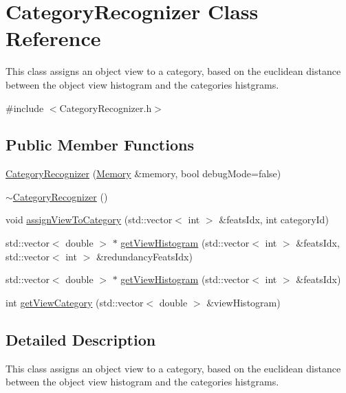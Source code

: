 \hypertarget{class_category_recognizer}{}\section{Category\+Recognizer Class Reference}
\label{class_category_recognizer}


This class assigns an object view to a category, based on the euclidean distance between the object view histogram and the categories histgrams.  




{\ttfamily \#include $<$Category\+Recognizer.\+h$>$}

\subsection*{Public Member Functions}
\begin{DoxyCompactItemize}
\item 
\hyperlink{class_category_recognizer_a67c56c30b0cb2783842c53169e7176c4}{Category\+Recognizer} (\hyperlink{class_memory}{Memory} \&memory, bool debug\+Mode=false)
\item 
\hyperlink{class_category_recognizer_a0b47f145ff89da44fa5191a52a6c558a}{$\sim$\+Category\+Recognizer} ()
\item 
void \hyperlink{class_category_recognizer_abb06a33eac9f693dc38a40f8c0b107f8}{assign\+View\+To\+Category} (std\+::vector$<$ int $>$ \&feats\+Idx, int category\+Id)
\item 
std\+::vector$<$ double $>$ $\ast$ \hyperlink{class_category_recognizer_ac712455609c64f0caca9977519824d7d}{get\+View\+Histogram} (std\+::vector$<$ int $>$ \&feats\+Idx, std\+::vector$<$ int $>$ \&redundancy\+Feats\+Idx)
\item 
std\+::vector$<$ double $>$ $\ast$ \hyperlink{class_category_recognizer_a9d9a2d29796bfd033a5045411392b195}{get\+View\+Histogram} (std\+::vector$<$ int $>$ \&feats\+Idx)
\item 
int \hyperlink{class_category_recognizer_ab66fab9c9404447350f1ce81adc83007}{get\+View\+Category} (std\+::vector$<$ double $>$ \&view\+Histogram)
\end{DoxyCompactItemize}


\subsection{Detailed Description}
This class assigns an object view to a category, based on the euclidean distance between the object view histogram and the categories histgrams. 


